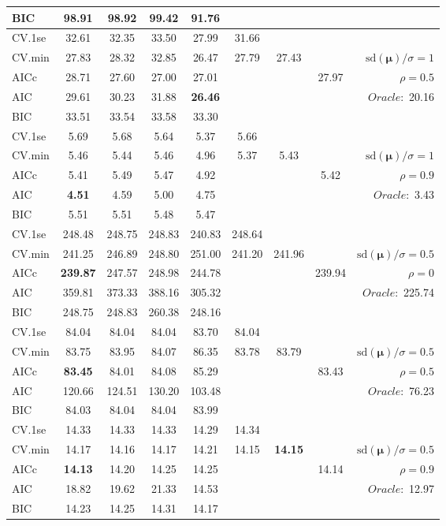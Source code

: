 \begin{table}
\begin{center}
\begin{tabular}{l*{7}{c}|r}
BIC & 98.91 & 98.92 & 99.42 & 91.76 & & & &  \\
 \hline 
CV.1se & 32.61 & 32.35 & 33.50 & 27.99 & 31.66 & & & \\
CV.min & 27.83 & 28.32 & 32.85 & 26.47 & 27.79 & 27.43 & & $\mathrm{sd}(\mathbf{\mu})/\sigma=1$ \\
AICc & 28.71 & 27.60 & 27.00 & 27.01 & & & 27.97 &  $\rho=0.5$ \\
AIC & 29.61 & 30.23 & 31.88 & {\bf 26.46} & & & &  \multirow{2}{*}{$Oracle: $ 20.16} \\
BIC & 33.51 & 33.54 & 33.58 & 33.30 & & & &  \\
 \hline 
CV.1se & 5.69 & 5.68 & 5.64 & 5.37 & 5.66 & & & \\
CV.min & 5.46 & 5.44 & 5.46 & 4.96 & 5.37 & 5.43 & & $\mathrm{sd}(\mathbf{\mu})/\sigma=1$ \\
AICc & 5.41 & 5.49 & 5.47 & 4.92 & & & 5.42 &  $\rho=0.9$ \\
AIC & {\bf 4.51} & 4.59 & 5.00 & 4.75 & & & &  \multirow{2}{*}{$Oracle: $ 3.43} \\
BIC & 5.51 & 5.51 & 5.48 & 5.47 & & & &  \\
 \hline 
CV.1se & 248.48 & 248.75 & 248.83 & 240.83 & 248.64 & & & \\
CV.min & 241.25 & 246.89 & 248.80 & 251.00 & 241.20 & 241.96 & & $\mathrm{sd}(\mathbf{\mu})/\sigma=0.5$ \\
AICc & {\bf 239.87} & 247.57 & 248.98 & 244.78 & & & 239.94 &  $\rho=0$ \\
AIC & 359.81 & 373.33 & 388.16 & 305.32 & & & &  \multirow{2}{*}{$Oracle: $ 225.74} \\
BIC & 248.75 & 248.83 & 260.38 & 248.16 & & & &  \\
 \hline 
CV.1se & 84.04 & 84.04 & 84.04 & 83.70 & 84.04 & & & \\
CV.min & 83.75 & 83.95 & 84.07 & 86.35 & 83.78 & 83.79 & & $\mathrm{sd}(\mathbf{\mu})/\sigma=0.5$ \\
AICc & {\bf 83.45} & 84.01 & 84.08 & 85.29 & & & 83.43 &  $\rho=0.5$ \\
AIC & 120.66 & 124.51 & 130.20 & 103.48 & & & &  \multirow{2}{*}{$Oracle: $ 76.23} \\
BIC & 84.03 & 84.04 & 84.04 & 83.99 & & & &  \\
 \hline 
CV.1se & 14.33 & 14.33 & 14.33 & 14.29 & 14.34 & & & \\
CV.min & 14.17 & 14.16 & 14.17 & 14.21 & 14.15 & {\bf 14.15} & & $\mathrm{sd}(\mathbf{\mu})/\sigma=0.5$ \\
AICc & {\bf 14.13} & 14.20 & 14.25 & 14.25 & & & 14.14 &  $\rho=0.9$ \\
AIC & 18.82 & 19.62 & 21.33 & 14.53 & & & &  \multirow{2}{*}{$Oracle: $ 12.97} \\
BIC & 14.23 & 14.25 & 14.31 & 14.17 & & & &  \\
 \hline 
\end{tabular}
\end{center}
\vspace{-1cm}
\end{table}





